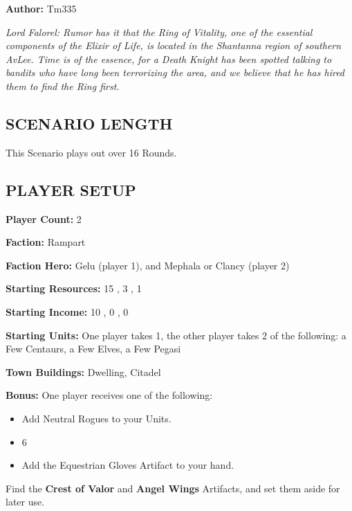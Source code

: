
\begin{multicols*}{2}

\textbf{Author:} Tm335

\textit{Lord Falorel: Rumor has it that the Ring of Vitality, one of the essential components of the Elixir of Life, is located in the Shantanna region of southern AvLee.
  Time is of the essence, for a Death Knight has been spotted talking to bandits who have long been terrorizing the area, and we believe that he has hired them to find the Ring first.
}


\subsection*{\MakeUppercase{Scenario Length}}

This Scenario plays out over 16 Rounds.

\subsection*{\MakeUppercase{Player Setup}}

\textbf{Player Count:} 2

\textbf{Faction:} Rampart

\textbf{Faction Hero:} Gelu (player 1), and Mephala or Clancy (player 2)

\textbf{Starting Resources:} 15 , 3 , 1 

\textbf{Starting Income:} 10 , 0 , 0 

\textbf{Starting Units:} One player takes 1, the other player takes 2 of the following: a Few Centaurs, a Few Elves, a Few Pegasi

\textbf{Town Buildings:}  Dwelling, Citadel

\textbf{Bonus:} One player receives one of the following:
\begin{itemize}
  \item Add Neutral  Rogues to your Units.
  \item 6 
  \item Add the Equestrian Gloves Artifact to your hand.
\end{itemize}

Find the \textbf{Crest of Valor} and \textbf{Angel Wings} Artifacts, and set them aside for later use.


\end{multicols*}
